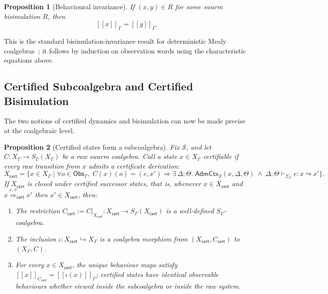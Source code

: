 \documentclass[a4paper,fleqn]{cas-sc}
\newtheorem{proposition}{Proposition}
\newcommand{\sem}[1]{\left[\!\left[#1\right]\!\right]}
\newcommand{\Obs}{\mathsf{Obs}}
\newcommand{\cert}{\mathsf{cert}}
\begin{document}
\begin{proposition}[Behavioural invariance]\label{prop:behavioural-invariance}
If \((x,y)\in R\) for some swarm bisimulation \(R\), then
\[
  \sem{x}_{\Gamma}=\sem{y}_{\Gamma}.
\]
\end{proposition}

This is the standard bisimulation-invariance result for deterministic Mealy
coalgebras~\cite{rutten2000,jacobs2016}; it follows by induction on observation
words using the characteristic equations above.

\subsection{Certified Subcoalgebra and Certified Bisimulation}

The two notions of certified dynamics and bisimulation can now be made precise at the coalgebraic level.

\begin{proposition}[Certified states form a subcoalgebra]\label{prop:certified-subcoalgebra}
Fix \(\mathcal S\), and let \(C:X_{\Gamma}\to S_{\Gamma}(X_{\Gamma})\) be a raw swarm coalgebra. Call a state \(x\in X_{\Gamma}\) \emph{certifiable} if every raw transition from \(x\) admits a certificate derivation:
\[
  X_{\cert}=\bigl\{x\in X_{\Gamma}\mid\forall o\in\Obs_{\Gamma},\;
  C(x)(o)=(e,x')
  \Rightarrow
  \exists\,\Delta;\Theta.\;
  \mathsf{AdmCtx}_{\mathcal S}(x,\Delta,\Theta)\ \land\
  \Delta;\Theta\vdash_{\Sigma_{\Gamma}}e:x\leadsto x'
  \bigr\}.
\]
If \(X_{\cert}\) is closed under certified successor states, that is, whenever \(x\in X_{\cert}\) and \(x\overset{e,o}{\Longrightarrow}_{\cert}x'\) then \(x'\in X_{\cert}\), then:
\begin{enumerate}
  \item The restriction \(C_{\cert}:=C|_{X_{\cert}}:X_{\cert}\to S_{\Gamma}(X_{\cert})\) is a well-defined \(S_{\Gamma}\)-coalgebra.
  \item The inclusion \(\iota:X_{\cert}\hookrightarrow X_{\Gamma}\) is a coalgebra morphism from \((X_{\cert},C_{\cert})\) to \((X_{\Gamma},C)\).
  \item For every \(x\in X_{\cert}\), the unique behaviour maps satisfy \(\sem{x}_{C_{\cert}}=\sem{\iota(x)}_{\Gamma}\); certified states have identical observable behaviours whether viewed inside the subcoalgebra or inside the raw system.
\end{enumerate}
\end{proposition}
\end{document}
